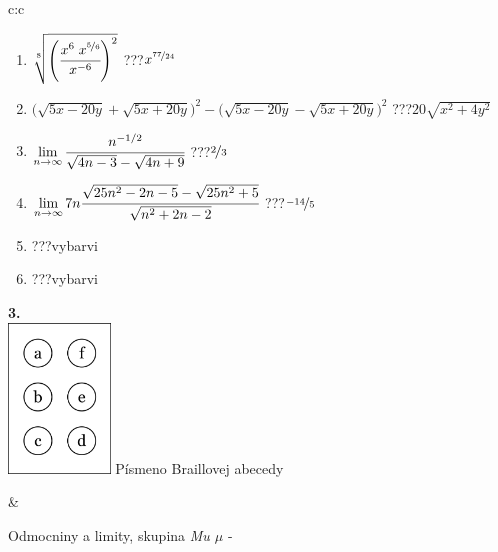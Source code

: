 \documentclass[10pt]{report}
\begin{document}
\begin{tabular}{c:c}
\begin{minipage}[c][104.5mm][t]{0.5\linewidth}
\begin{center}
\begin{minipage}{0.79\linewidth}
\begin{center}
\begin{varwidth}{\linewidth}
\begin{enumerate}
\small
\item $\sqrt[8]{\left(\cfrac{x^{6}\;x^{\nicefrac{5}{6}}}{x^{-6}}\right)^{2}}$\quad \dotfill\; ???\;\dotfill \quad $x^{\nicefrac{77}{24}}$
\item {\footnotesize{\scriptsize$\big(\sqrt{5x-20y}+\sqrt{5x+20y}\big)^2-\big(\sqrt{5x-20y}-\sqrt{5x+20y}\big)^2$}\quad \dotfill\; ???\;\dotfill \quad $20\sqrt{x^2+4y^2}$}
\item $\lim\limits_{n\to\infty}\cfrac{n^{-1/2}}{\sqrt{4n-3}-\sqrt{4n+9}}$\quad \dotfill\; ???\;\dotfill \quad $\nicefrac{2}{3}$
\item $\lim\limits_{n\to\infty}7n\cfrac{\sqrt{25n^2-2n-5}-\sqrt{25n^2+5}}{\sqrt{n^2+2n-2}}$\quad \dotfill\; ???\;\dotfill \quad $\nicefrac{-14}{5}$
\item \quad \dotfill\; ???\;\dotfill \quad vybarvi
\item \quad \dotfill\; ???\;\dotfill \quad vybarvi
\end{enumerate}
\end{varwidth}
\end{center}
\end{minipage}
\begin{minipage}{0.20\linewidth}
\begin{center}
{\Huge\bfseries 3.} \\[2mm]
\includegraphics[height=40mm]{../images/braille.png}
{\small Písmeno Braillovej abecedy}
\end{center}
\end{minipage}
\end{center}
\end{minipage}
&
\begin{minipage}[c][104.5mm][t]{0.5\linewidth}
\begin{center}
\vspace{7mm}
{\huge Odmocniny a limity, skupina \textit{Mu $\mu$} -}\\[5mm]

\end{center}
\end{minipage}
\end{tabular}
\end{document}
